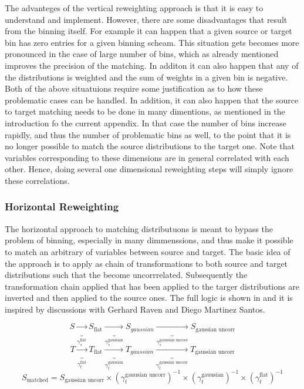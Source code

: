 The advanteges of the vertical reweighting approach is that it is easy to understand and implement.
However, there are some disadvantages that result from the binning itself. For example it can happen
that a given source or target bin has zero entries for a given binning scheam. This situation gets
becomes more pronounced in the case of large number of bins, which as already mentioned improves the
precision of the matching. In additon it can also happen that any of the distributions is weighted and
the sum of weights in a given bin is negative. Both of the above situatuions require some justification
as to how these problematic cases can be handled. In addition, it can also happen that the source to
target matching needs to be done in many dimentions, as mentioned in the introduction fo the current
appendix. In that case the number of bins increase rapidly, and thus the number of problematic bins as well,
to the point that it is no longer possible to match the source distributions to the target one.
Note that variables corresponding to these dimensions are in general correlated with each other.
Hence, doing several one dimensional reweighting steps will simply ignore these correlations.

\subsubsection{Horizontal Reweighting}
The horizontal approach to matching distributuons is meant to bypass the problem of binning, especially
in many dimmenssions, and thus make it possible to match an arbitrary of variables between source and target.
The basic idea of the approach is to apply as chain of transformations to both source and target distributions
such that the become uncorrrelated. Subsequently the transformation chain applied that has been applied to
the targer distributions are inverted and then applied to the source ones. The full logic is shown in \figref{}
and it is inspired by discussions with Gerhard Raven and Diego Martinez Santos.

\begin{equation}
 S \underbrace{\rightarrow}_{\gamma_s^{\text{flat}}}  S_\text{flat} \underbrace{\rightarrow}_{\gamma_s^{\text{gaussian}}} S_{gaussian} \underbrace{\rightarrow}_{\gamma_s^{\text{gaussian uncoor}}} S_\text{gaussian uncorr} \nonumber
\end{equation}
\begin{equation}
 T \underbrace{\rightarrow}_{\gamma_t^{\text{flat}}}  T_\text{flat} \underbrace{\rightarrow}_{\gamma_t^{\text{gaussian}}} T_{gaussian} \underbrace{\rightarrow}_{\gamma_t^{\text{gaussian uncoor}}} T_\text{gaussian uncorr} \nonumber
\end{equation}
\begin{equation}
S_\text{matched} = S_\text{gaussian uncorr} \times (\gamma_t^{\text{gauusian uncorr}})^{-1} \times (\gamma_t^{\text{gauusian}})^{-1} \times (\gamma_t^{\text{flat}})^{-1} \nonumber
\end{equation}

